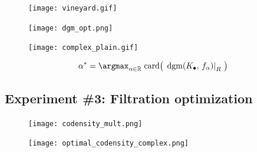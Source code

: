 \documentclass[
  letterpaper,
  DIV=11,
  numbers=noendperiod,
  oneside]{scrartcl}
\begin{document}
\begin{figure}

\begin{minipage}[b]{0.25\linewidth}

{\centering 

\texttt{[image: vineyard.gif]}

}

\end{minipage}%
%
\begin{minipage}[b]{0.50\linewidth}

{\centering 

\texttt{[image: dgm\_opt.png]}

}

\end{minipage}%
%
\begin{minipage}[b]{0.25\linewidth}

{\centering 

\texttt{[image: complex\_plain.gif]}

}

\end{minipage}%

\end{figure}

\[ 
\alpha^\ast = \argmax_{\alpha \in \mathbb{R}} \; \mathrm{card}\big(\, \left.\mathrm{dgm}(K_\bullet, \, f_\alpha) \right|_{R} \, \big) 
\]

\hypertarget{experiment-3-filtration-optimization-1}{%
\subsection{Experiment \#3: Filtration
optimization}\label{experiment-3-filtration-optimization-1}}

\begin{figure}

\begin{minipage}[b]{0.67\linewidth}

{\centering 

\texttt{[image: codensity\_mult.png]}

}

\end{minipage}%
%
\begin{minipage}[b]{0.33\linewidth}

{\centering 

\texttt{[image: optimal\_codensity\_complex.png]}

}

\end{minipage}%

\end{figure}
\end{document}

